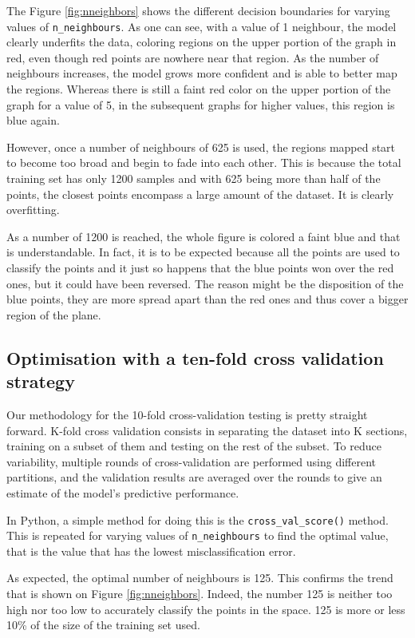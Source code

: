 \documentclass[12pt]{article}
\begin{document}
The Figure \ref{fig:nneighbors} shows the different decision boundaries for varying values of \texttt{n\_neighbours}. As one can see, with a value of 1 neighbour, the model clearly underfits the data, coloring regions on the upper portion of the graph in red, even though red points are nowhere near that region. As the number of neighbours increases, the model grows more confident and is able to better map the regions. Whereas there is still a faint red color on the upper portion of the graph for a value of 5, in the subsequent graphs for higher values, this region is blue again.

However, once a number of neighbours of 625 is used, the regions mapped start to become too broad and begin to fade into each other. This is because the total training set has only 1200  samples and with 625 being more than half of the points, the closest points encompass a large amount of the dataset. It is clearly overfitting.

As a number of 1200 is reached, the whole figure is colored a faint blue and that is understandable. In fact, it is to be expected because all the points are used to classify the points and it just so happens that the blue points won over the red ones, but it could have been reversed. The reason might be the disposition of the blue points, they are more spread apart than the red ones and thus cover a bigger region of the plane.
~
~
~
~
\subsection{Optimisation with a ten-fold cross validation strategy}

Our methodology for the 10-fold cross-validation testing is pretty straight forward. K-fold cross validation consists in separating the dataset into K sections, training on a subset of them and testing on the rest of the subset. To reduce variability, multiple rounds of cross-validation are performed using different partitions, and the validation results are averaged over the rounds to give an estimate of the model’s predictive performance. 

In Python, a simple method for doing this is the \texttt{cross\_val\_score()} method.
This is repeated for varying values of \texttt{n\_neighbours} to find the optimal value, that is the value that has the lowest misclassification error.


As expected, the optimal number of neighbours is 125. This confirms the trend that is shown on Figure \ref{fig:nneighbors}. Indeed, the number 125 is neither too high nor too low to accurately classify the points in the space. 125 is more or less 10\% of the size of the training set used.
\end{document}
